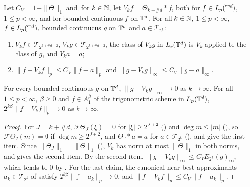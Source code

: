 \begin{lemma}
\label{lem:torus-vallee-poussin}
\leanok
{}
Let $C_V = 1 + \|\Theta\|_1$ and, for $k \in \mathbb{N}$, let $V_k f = \Theta_{k+\#d} * f$, both for
$f \in L_p(\mathbb{T}^d)$, $1 \leq p < \infty$, and for bounded continuous $f$ on $\mathbb{T}^d$. For all
$k \in \mathbb{N}$, $1 \leq p < \infty$, $f \in L_p(\mathbb{T}^d)$, bounded continuous $g$ on $\mathbb{T}^d$ and
$a \in \mathcal{T}_{2^k}$:
\begin{enumerate}
  \item $V_k f \in \mathcal{T}_{2^{k+\#d+2}}$, $V_k g \in \mathcal{T}_{2^{k+\#d+2}}$, the class
    of $V_k g$ in $L_p(\mathbb{T}^d)$ is $V_k$ applied to the class of $g$, and $V_k a = a$;
  \item $\|f - V_k f\|_p \leq C_V \|f - a\|_p$ and
    $\|g - V_k g\|_\infty \leq C_V \|g - a\|_\infty$.
\end{enumerate}
For every bounded continuous $g$ on $\mathbb{T}^d$, $\|g - V_k g\|_\infty \to 0$ as $k \to \infty$. For
all $1 \leq p < \infty$, $\beta \geq 0$ and $f \in A^\beta_1$ of the trigonometric scheme in
$L_p(\mathbb{T}^d)$, $2^{k\beta} \|f - V_k f\|_p \to 0$ as $k \to \infty$.
\end{lemma}

\begin{proof}
\leanok
For $J = k + \#d$, $\mathcal{F}\Theta_J(\xi) = 0$ for $|\xi| \geq 2^{J+2}$
() and $\deg m \leq |m|$ (), so
$\mathcal{F}\Theta_J(m) = 0$ if $\deg m \geq 2^{J+2}$, and $\Theta_J * a = a$ for
$a \in \mathcal{T}_{2^k}$ ().  and
 give the first item. Since
$\|\Theta_J\|_1 = \|\Theta\|_1$ (), $V_k$ has norm at most
$\|\Theta\|_1$ in both norms, and  gives the second item. By the
second item, $\|g - V_k g\|_\infty \leq C_V E_{2^k}(g)_\infty$, which tends to $0$ by
. For the last claim, the canonical near-best approximants
$a_k \in \mathcal{T}_{2^k}$ of  satisfy $2^{k\beta} \|f - a_k\|_p \to 0$, and
$\|f - V_k f\|_p \leq C_V \|f - a_k\|_p$.
\end{proof}

